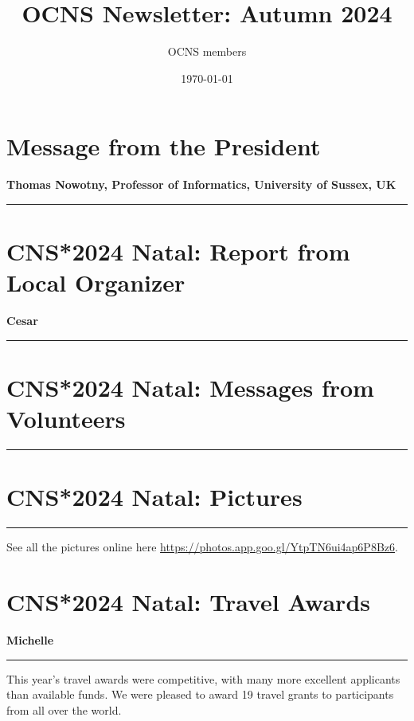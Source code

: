 \documentclass[11pt,a4paper,oneside]{article}
\title{OCNS Newsletter: Autumn 2024}
\author{OCNS members}
\date{\today}
\begin{document}
\pagestyle{fancy}
\fancyhead{}
\fancyfoot{}
\maketitle
\newpage

\pagestyle{fancy}
\fancyhead{}
\fancyfoot{}

\newpage
\section*{Message from the President}%
\textbf{\large Thomas Nowotny, Professor of Informatics, University of Sussex, UK\\}
\rule{\textwidth}{0.4pt}

\lipsum[1-3]

\newpage
\section*{CNS*2024 Natal: Report from Local Organizer}%
\textbf{\large Cesar\\}
\rule{\textwidth}{0.4pt}
\lipsum[1-3]

\newpage
\section*{CNS*2024 Natal: Messages from Volunteers}%
\rule{\textwidth}{0.4pt}
\lipsum[1-3]

\newpage
\section*{CNS*2024 Natal: Pictures}%
\rule{\textwidth}{0.4pt}
See all the pictures online here \url{https://photos.app.goo.gl/YtpTN6ui4ap6P8Bz6}.

\newpage
\section*{CNS*2024 Natal: Travel Awards}%
\textbf{\large Michelle\\}
\rule{\textwidth}{0.4pt}
This year's travel awards were competitive, with many more excellent applicants than available funds.
We were pleased to award 19 travel grants to participants from all over the world.

\newpage
\end{document}
